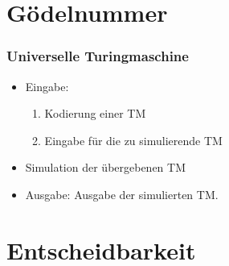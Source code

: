 


\section{Gödelnummer}


\begin{frame}
	\frametitle{Universelle Turingmaschine}
\begin{itemize}

\item Eingabe:
\begin{enumerate}
\item Kodierung einer TM
\item Eingabe für die zu simulierende TM
\end{enumerate}
\item Simulation der übergebenen TM
\item Ausgabe: Ausgabe der simulierten TM.
\end{itemize}
\end{frame}
\section{Entscheidbarkeit}
